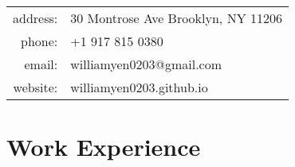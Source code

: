 \documentclass[a4paper,10pt]{article} %
\begin{document}
\pagestyle{empty} %



\par{\bigskip\par} %


\begin{center}
\begin{tabular}{rl}
address: & 30 Montrose Ave Brooklyn, NY 11206 \\
phone: & +1 917 815 0380\\
email: & williamyen0203@gmail.com \\
website: & williamyen0203.github.io
\end{tabular}
\end{center}


\section{Work Experience}
\end{document}
